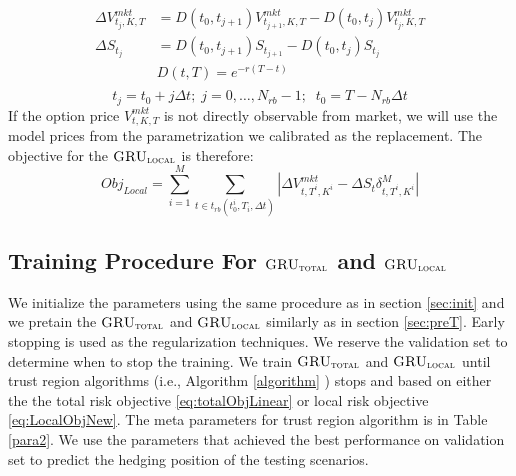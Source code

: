 \documentclass[letterpaper,12pt,titlepage,oneside,final]{book}
\numberwithin{equation}{section}
\theoremstyle{definition}
\newcommand{\modelT}{\textsc{GRU}_{\textsc{total}}}
\newcommand{\modelL}{\textsc{GRU}_{\textsc{local}}}
\newcommand{\DS}{\Delta S}
\newcommand{\DT}{\Delta t}
\newcommand{\Smkt}{S}
\begin{document}
\[
\begin{split}
\Delta V^{mkt}_{t_j,K,T}& =D(t_0,t_{j+1}) V^{mkt}_{t_{j+1},K,T}-D(t_0,t_{j})V^{mkt}_{t_j,K,T}\\
\Delta \Smkt_{t_j} &=D(t_0,t_{j+1}) \Smkt_{t_{j+1}}-D(t_0,t_{j}) \Smkt_{t_{j}}\\
&D(t,T)=e^{-r(T-t)}\\
\end{split}
\]
\[
t_j=t_0+j \Delta t;\; j=0,\dots,N_{rb}-1;\;\;t_0=T-N_{rb}\DT
\] 
If the option price $V^{mkt}_{t,K,T}$ is not directly observable from market, we will use the model prices from the parametrization we calibrated as the replacement.
The objective for the  $\modelL$  is therefore:
\begin{equation}
Obj_{Local}=\sum_{i=1}^M \sum_{t\in t_{rb}(t_0^i, T_i,\Delta t)} |\Delta V^{mkt}_{t,T^i,K^i}-\DS_{t} \delta^{M}_{t,T^i,K^i}|
\label{eq:LocalObjNew}
\end{equation}

\subsection{Training Procedure For $\modelT$ and $\modelL$}
\label{sec:TotalModelProcedure}
We  initialize the  parameters using the same procedure as in section \ref{sec:init} and we pretain the $\modelT$ and $\modelL$ similarly as in section \ref{sec:preT}. Early stopping is used as the regularization techniques. We reserve the validation set to determine when to stop the training. 
We train $\modelT$ and $\modelL$ until trust region algorithms (i.e., Algorithm \ref{algorithm} ) stops and based on either the the total risk objective \eqref{eq:totalObjLinear} or local risk objective \eqref{eq:LocalObjNew}. The meta parameters for trust region algorithm is in Table \ref{para2}.
We use the parameters that achieved the best performance on validation set to predict the hedging position of the testing scenarios.
\end{document}
